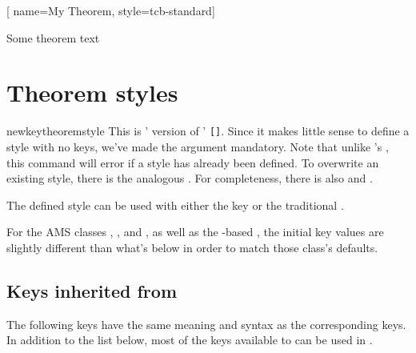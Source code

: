 \documentclass{ltxdoc}
\newcommand{\bracks}[1]{\texttt{[#1]}}
\begin{document}
\begin{tcbwritetemp}
[
  name=My Theorem,
  style=tcb-standard]
\end{tcbwritetemp}

\begin{keythmscode}[withpreamble]
\begin{mytheo}
Some theorem text
\end{mytheo}
\end{keythmscode}

\section{Theorem styles}

\begin{docCommand}{newkeytheoremstyle}
  {}
This is ' version of ' \bracks{}.
Since it makes little sense to define a style with no keys, we've made the  argument mandatory.
Note that unlike 's , this command will error if a style has already been defined.
To overwrite an existing style, there is the analogous .
For completeness, there is also  and .

The defined style can be used with either the  key or the traditional .
\end{docCommand}

\begin{notebox}
For the AMS classes , , and , as well as the -based , the initial key values are slightly different than what's below in order to match those class's defaults.
\end{notebox}

\subsection{Keys inherited from }

The following keys have the same meaning and syntax as the corresponding  keys.
In addition to the list below, most of the keys available to  can be used in .
\end{document}
